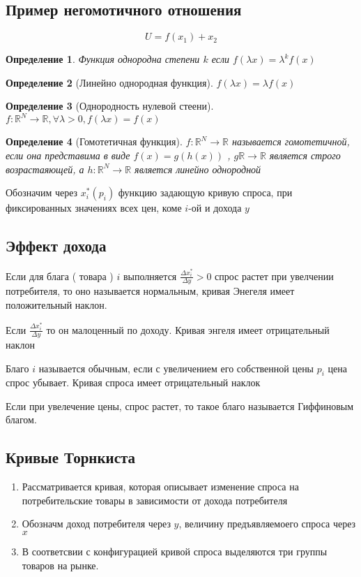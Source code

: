 \documentclass[14pt]{extarticle}
\newtheorem{definition}{Определение}
\begin{document}
 \subsection{Пример негомотичного отношения}
 \begin{equation}
 U = f(x_1) + x_2
 \end{equation} 
 \begin{definition}
	 Функция однородна степени $k$  если $f(\lambda x) = \lambda^{k} f(x)$
 \end{definition}
 \begin{definition}[Линейно однородная функция]
	 $f(\lambda x) = \lambda f(x)$
 \end{definition}
 \begin{definition}[Однородность нулевой стеени]
	 $f:\mathbb{R}^{N} \to \mathbb{R}, \forall  \lambda > 0 ,f(\lambda x) = f(x)$
 \end{definition}
 \begin{definition}[Гомотетичная функция]
 	$f: \mathbb{R}^{N} \to \mathbb{R}$ 
	называется гомотетичной, если она представима в виде
	$f(x) = g(h(x))$ ,  $g\mathbb{R} \to \mathbb{R}$ 
	является строго возрастаяющей, а $h:\mathbb{R}^{N} \to \mathbb{R}$ является линейно однородной
 \end{definition}
 Обозначим через $x^{*}_{i} (p_{i}) $ 
 функцию задающую кривую спроса, при фиксированных значениях 
 всех цен, коме $i$-ой и дохода  $y$

 \subsection{Эффект дохода}
 Если для блага ( товара )  $i$ выполняется
 $\frac{\Delta x_{i}^{*}}{\Delta y} > 0$ 
 спрос растет при увелчении потребителя, то оно называется
 нормальным, кривая Энегеля имеет положительный наклон.

 Если $\frac{\Delta x_{i}^{*}}{\Delta y}$ то он малоценный по 
 доходу. Кривая энгеля имеет отрицательный наклон

 Благо $i$ называется обычным, если с увеличением его собственной
 цены  $p_{i}$ цена  спрос убывает. Кривая спроса имеет отрицательный наклок

 Если при увелечение цены, спрос растет, то такое благо называется
 Гиффиновым благом.

 \subsection{Кривые Торнкиста}
 \begin{enumerate}
 	\item Рассматривается кривая, которая описывает
		изменение спроса на потребительские товары в зависимости от дохода потребителя
	\item Обозначм доход потребителя через $y$,
		величину предъявляемоего спроса через  $x$
	\item В соответсвии с конфигурацией кривой спроса 
		выделяются три группы товаров на рынке.
 \end{enumerate}
\end{document}
